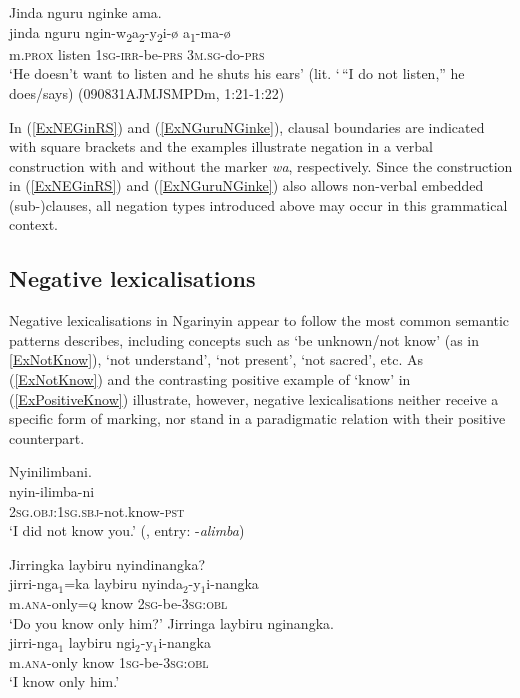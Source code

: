 \documentclass[output=paper,colorlinks,citecolor=brown]{langscibook}
\begin{document}
\begin{exe}
\ex \label{ExNGuruNGinke}
\glll {\ob}{\ob}Jinda nguru nginke{\cb} ama.{\cb}\\
{\db}{\db}jinda nguru ngin-w\textsubscript{2}a\textsubscript{2}-y\textsubscript{2}i-{\o} a\textsubscript{1}-ma-{\o}\\
{\db}{\db}m.\textsc{prox} listen 1\textsc{sg}-\textsc{irr}-{be}-\textsc{prs} 3\textsc{m.sg}-do-\textsc{prs} \\
\trans `He doesn't want to listen and he shuts his ears' (lit. `\,``I do not listen,'' he does/says) (090831AJMJSMPDm, 1:21-1:22)
\end{exe}

In (\ref{ExNEGinRS}) and (\ref{ExNGuruNGinke}), clausal boundaries are indicated with square brackets and the examples illustrate negation in a verbal construction with and without the marker \textit{wa}, respectively. Since the construction in (\ref{ExNEGinRS}) and (\ref{ExNGuruNGinke}) also allows non-verbal embedded (sub-)clauses, all negation types introduced above may occur in this grammatical context.

\subsection{Negative lexicalisations}

Negative lexicalisations in Ngarinyin appear to follow the most common semantic patterns \citet{Veselinova2013lexicalization, Veselinova2013neg.exist} describes, including concepts such as `be unknown/not know' (as in \ref{ExNotKnow}), `not understand', `not present', `not sacred', etc. As (\ref{ExNotKnow}) and the contrasting positive example of `know' in (\ref{ExPositiveKnow}) illustrate, however, negative lexicalisations neither receive a specific form of marking, nor stand in a paradigmatic relation with their positive counterpart.

\begin{exe}
\ex \label{ExNotKnow}
\glll Nyinilimbani.\\
nyin-ilimba-ni\\
\textsc{2sg.obj:1sg.sbj}-not.know-\textsc{pst}\\
\trans `I did not know you.' (\citealp{CoatElkin1974}, entry: -\textit{alimba})
\end{exe}

\begin{exe}
\ex \label{ExPositiveKnow}
\begin{xlist}
\glll Jirringka laybiru nyindinangka?\\
jirri-nga$_1$=ka laybiru nyinda$_2$-y$_1$i-nangka\\
m.\textsc{ana}-only=\textsc{q} know 2\textsc{sg}-be-3\textsc{sg:obl}\\
\trans `Do you know only him?'
\glll Jirringa laybiru nginangka.\\
jirri-nga$_1$ laybiru ngi$_2$-y$_1$i-nangka\\
m.\textsc{ana}-only know 1\textsc{sg}-be-3\textsc{sg:obl}\\
\trans `I know only him.'
\end{xlist}
\end{exe}
\end{document}

